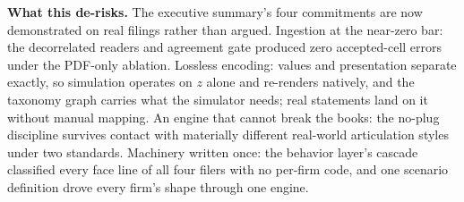 \documentclass[11pt]{article}
\newcommand{\lead}[2]{\par\addvspace{5pt}\textbf{\textcolor{#1}{#2}}}
\begin{document}
\lead{navytwo}{What this de-risks.} The executive summary's four commitments are now demonstrated on real filings rather than argued. Ingestion at the near-zero bar: the decorrelated readers and agreement gate produced zero accepted-cell errors under the PDF-only ablation. Lossless encoding: values and presentation separate exactly, so simulation operates on $z$ alone and re-renders natively, and the taxonomy graph carries what the simulator needs; real statements land on it without manual mapping. An engine that cannot break the books: the no-plug discipline survives contact with materially different real-world articulation styles under two standards. Machinery written once: the behavior layer's cascade classified every face line of all four filers with no per-firm code, and one scenario definition drove every firm's shape through one engine.

\end{document}
